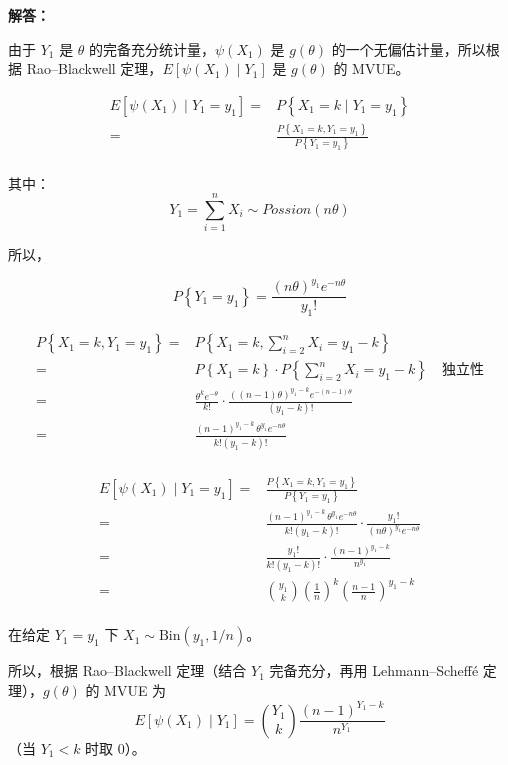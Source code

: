 \documentclass[12pt,a4paper]{article}
\begin{document}
\begin{answerbox}
\textbf{解答：}

由于 $Y_1$ 是 $\theta$ 的完备充分统计量，$\psi(X_1)$ 是 $g(\theta)$ 的一个无偏估计量，所以根据 Rao--Blackwell 定理，$E\left[\psi(X_1) \mid Y_1\right]$ 是 $g(\theta)$ 的 MVUE。

$$
\begin{aligned}
E\left[\psi(X_1) \mid Y_1 = y_1\right] =& P\left\{X_1=k \mid Y_1=y_1\right\} \\
=& \frac{P\left\{X_1=k, Y_1=y_1\right\}}{P\left\{Y_1=y_1\right\}} \\
\end{aligned}
$$

其中：
$$
Y_1 = \sum_{i=1}^{n} X_i \sim Possion(n\theta)
$$


所以，

$$
P\left\{Y_1 = y_1\right\} = \frac{(n\theta)^{y_1} e^{-n\theta}}{y_1!}
$$

$$
\begin{aligned}
P\left\{X_1=k, Y_1=y_1\right\} =& P\left\{X_1=k, \sum_{i=2}^{n} X_i = y_1-k\right\} \\
=& P\left\{X_1=k\right\} \cdot P\left\{\sum_{i=2}^{n} X_i = y_1-k\right\}  \quad \text{独立性}\\
=& \frac{\theta^k e^{-\theta}}{k!} \cdot \frac{((n-1)\theta)^{y_1-k} e^{-(n-1)\theta}}{(y_1-k)!} \\
=& \frac{(n-1)^{y_1-k}\,\theta^{y_1} e^{-n\theta}}{k!(y_1-k)!} \\
\end{aligned}
$$

$$
\begin{aligned}
E\left[\psi(X_1) \mid Y_1=y_1\right] =&  \frac{P\left\{X_1=k, Y_1=y_1\right\}}{P\left\{Y_1=y_1\right\}} \\
=& \frac{(n-1)^{y_1-k}\,\theta^{y_1} e^{-n\theta}}{k!(y_1-k)!} \cdot \frac{y_1!}{(n\theta)^{y_1} e^{-n\theta}} \\
=& \frac{y_1!}{k!(y_1-k)!} \cdot \frac{(n-1)^{y_1-k}}{n^{y_1}} \\
=& \binom{y_1}{k}\left(\frac{1}{n}\right)^{k}\left(\frac{n-1}{n}\right)^{y_1-k} \\
\end{aligned}
$$

在给定 $Y_1=y_1$ 下 $X_1 \sim \text{Bin}(y_1, 1/n)$。

所以，根据 Rao--Blackwell 定理（结合 $Y_1$ 完备充分，再用 Lehmann--Scheffé 定理），$g(\theta)$ 的 MVUE 为
$$
E\left[\psi(X_1) \mid Y_1\right] = \binom{Y_1}{k}\frac{(n-1)^{Y_1-k}}{n^{Y_1}}
$$
（当 $Y_1 < k$ 时取 $0$）。

\end{answerbox}
\end{document}
